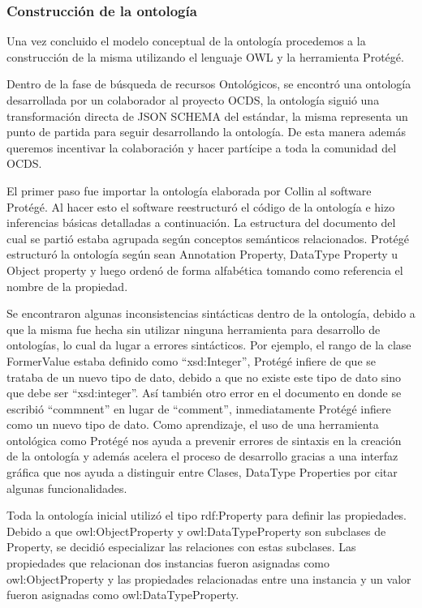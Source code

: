 \subsubsection{Construcción de la ontología}

Una vez concluido el modelo conceptual de la ontología procedemos a la construcción de la misma utilizando el lenguaje OWL y la herramienta Protégé.

Dentro de la fase de búsqueda de recursos Ontológicos, se encontró una ontología desarrollada por un colaborador al proyecto OCDS, la ontología siguió una transformación directa de JSON SCHEMA del estándar, la misma representa un punto de partida para seguir desarrollando la ontología. De esta manera además queremos incentivar la colaboración y hacer partícipe a toda la comunidad del OCDS.

El primer paso fue importar la ontología elaborada por Collin al software Protégé. Al hacer esto el software reestructuró el código de la ontología e hizo inferencias básicas detalladas a continuación. La estructura del documento del cual se partió estaba agrupada según conceptos semánticos relacionados. Protégé estructuró la ontología según sean Annotation Property, DataType Property u Object property y luego ordenó de forma alfabética tomando como referencia el nombre de la propiedad.

Se encontraron algunas inconsistencias sintácticas dentro de la ontología, debido a que la misma fue hecha sin utilizar ninguna herramienta para desarrollo de ontologías, lo cual da lugar a errores sintácticos. Por ejemplo, el rango de la clase FormerValue estaba definido como “xsd:Integer”, Protégé infiere de que se trataba de un nuevo tipo de dato,  debido a que no existe este tipo de dato sino que debe ser “xsd:integer”. Así también otro error en el documento en donde se escribió “commnent” en lugar de “comment”, inmediatamente Protégé infiere como un nuevo tipo de dato. Como aprendizaje, el uso de una herramienta ontológica como Protégé nos ayuda a prevenir errores de sintaxis en la creación de la ontología y además acelera el proceso de desarrollo gracias a una interfaz gráfica que nos ayuda a distinguir entre Clases, DataType Properties por citar algunas funcionalidades.

Toda la ontología inicial utilizó el tipo rdf:Property para definir las propiedades. Debido a que owl:ObjectProperty y owl:DataTypeProperty son subclases de Property, se decidió especializar las relaciones con estas subclases. Las propiedades que relacionan dos instancias fueron asignadas como owl:ObjectProperty y las propiedades relacionadas entre una instancia y un valor fueron asignadas como owl:DataTypeProperty.

